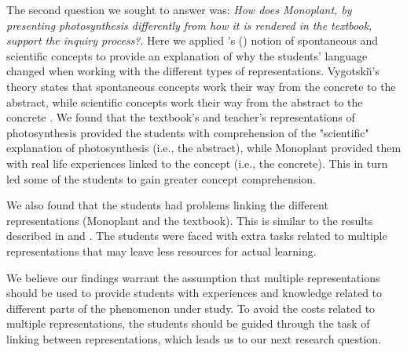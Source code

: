 The second question we sought to answer was: \emph{How does Monoplant, by presenting photosynthesis differently from how it is rendered in the textbook, support the inquiry process?}. Here we applied \citeauthor{vygotsky2012thought}'s (\citeyear{vygotsky2012thought}) notion of spontaneous and scientific concepts to provide an explanation of why the students' language changed when working with the different types of representations. Vygotski{\u\i}'s theory states that spontaneous concepts work their way from the concrete to the abstract, while scientific concepts work their way from the abstract to the concrete \citep{vygotsky2012thought}. We found that the textbook's and teacher's representations of photosynthesis provided the students with comprehension of the "scientific" explanation of photosynthesis (i.e., the abstract), while Monoplant provided them with real life experiences linked to the concept (i.e., the concrete). This in turn led some of the students to gain greater concept comprehension. 

We also found that the students had problems linking the different representations (Monoplant and the textbook). This is similar to the results described in \citet{ainsworth1999functions} and \citet{van2006supporting}. The students were faced with extra tasks related to multiple representations that may leave less resources for actual learning. 

We believe our findings warrant the assumption that multiple representations should be used to provide students with experiences and knowledge related to different parts of the phenomenon under study. To avoid the costs related to multiple representations, the students should be guided through the task of linking between representations, which leads us to our next research question.





